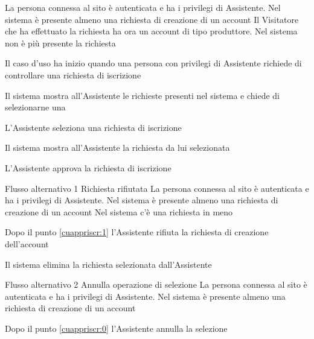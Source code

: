 {}
{La persona connessa al sito è autenticata e ha i privilegi di  Assistente. Nel sistema è presente almeno una richiesta di creazione di un account}
{Il Visitatore che ha effettuato la richiesta ha ora un account di tipo produttore. Nel sistema non è più presente la richiesta}
{\begin{enumCU}
	\item Il caso d'uso ha inizio quando una persona con privilegi di Assistente richiede di controllare una richiesta di iscrizione
	\item Il sistema mostra all'Assistente le richieste presenti nel sistema e chiede di selezionarne una\label{cuappriscr:0}
	\item L'Assistente seleziona una richiesta di iscrizione
	\item Il sistema mostra all'Assistente la richiesta da lui selezionata\label{cuappriscr:1}
	\item L'Assistente approva la richiesta di iscrizione
\end{enumCU}}
%
{Flusso alternativo 1}%
{Richiesta rifiutata}%
{La persona connessa al sito è autenticata e ha i privilegi di  Assistente. Nel sistema è presente almeno una richiesta di creazione di un account}%
{Nel sistema c'è una richiesta in meno}%
{\begin{enumCU}
		\item Dopo il punto \ref{cuappriscr:1} l'Assistente rifiuta la richiesta di creazione dell'account
		\item Il sistema elimina la richiesta selezionata dall'Assistente
\end{enumCU}}%
%
{Flusso alternativo 2}%
{Annulla operazione di selezione}%
{La persona connessa al sito è autenticata e ha i privilegi di  Assistente. Nel sistema è presente almeno una richiesta di creazione di un account}%
{\postNulle}%
{\begin{enumCU}
		\item Dopo il punto \ref{cuappriscr:0} l'Assistente annulla la selezione
\end{enumCU}}%

